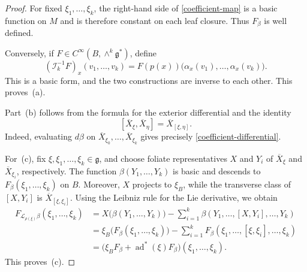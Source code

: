 \documentclass[10pt,a4paper]{amsart}
\begin{document}
\begin{proof}
For fixed $\xi_1,\dots,\xi_k$, the right-hand side of
\eqref{coefficient-map} is a basic function on $M$ and is therefore
constant on each leaf closure. Thus $F_\beta$ is well defined.

Conversely, if
$F\in C^\infty(B,\wedge^k\mathfrak g^*)$, define
\[
(\mathcal I_k^{-1}F)_x(v_1,\dots,v_k)
=
F(p(x))
\bigl(
\alpha_x(v_1),\dots,\alpha_x(v_k)
\bigr).
\]
This is a basic form, and the two constructions are inverse to each other.
This proves~(a).

Part~(b) follows from the formula for the exterior differential and the
identity
\[
[\overline X_\xi,\overline X_\eta]
=
\overline X_{[\xi,\eta]}.
\]
Indeed, evaluating $d\beta$ on
$\overline X_{\xi_0},\dots,\overline X_{\xi_k}$ gives precisely
\eqref{coefficient-differential}.

For~(c), fix $\xi,\xi_1,\dots,\xi_k\in\mathfrak g$, and choose foliate
representatives $X$ and $Y_i$ of $\overline X_\xi$ and
$\overline X_{\xi_i}$, respectively. The function
$\beta(Y_1,\dots,Y_k)$ is basic and descends to
$F_\beta(\xi_1,\dots,\xi_k)$ on $B$. Moreover, $X$ projects to $\xi_B$,
while the transverse class of $[X,Y_i]$ is
$\overline X_{[\xi,\xi_i]}$. Using the Leibniz rule for the Lie derivative,
we obtain
\begin{align*}
F_{\mathcal L_{\rho(\xi)}\beta}(\xi_1,\dots,\xi_k)
&=
X\bigl(\beta(Y_1,\dots,Y_k)\bigr)
-\sum_{i=1}^k
\beta(Y_1,\dots,[X,Y_i],\dots,Y_k)\\
&=
\xi_B\bigl(F_\beta(\xi_1,\dots,\xi_k)\bigr)
-\sum_{i=1}^k
F_\beta(\xi_1,\dots,[\xi,\xi_i],\dots,\xi_k)\\
&=
\bigl(\xi_BF_\beta+\operatorname{ad}^*(\xi)F_\beta\bigr)
(\xi_1,\dots,\xi_k).
\end{align*}
This proves~(c).
\end{proof}
\end{document}
